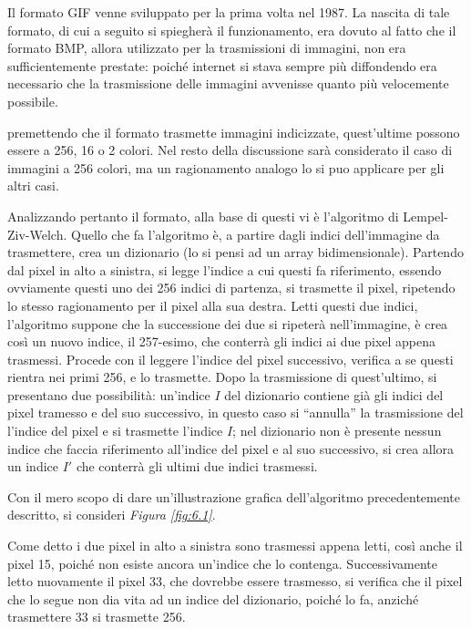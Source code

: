 \documentclass{subfiles}
\begin{document}
Il formato GIF venne sviluppato per la prima volta nel 1987. La nascita di tale formato, di cui a seguito si spiegherà il funzionamento,
era dovuto al fatto che il formato BMP, allora utilizzato per la trasmissioni di immagini, non era sufficientemente prestate:
poiché internet si stava sempre più diffondendo era necessario che la trasmissione delle immagini avvenisse quanto più velocemente possibile.

\begin{Note*}
    premettendo che il formato trasmette immagini indicizzate, quest'ultime possono essere a 256, 16 o 2 colori.
    Nel resto della discussione sarà considerato il caso di immagini a 256 colori, ma un ragionamento analogo lo si puo applicare per gli altri casi.
\end{Note*}

Analizzando pertanto il formato, alla base di questi vi è l'algoritmo di Lempel-Ziv-Welch.
Quello che fa l'algoritmo è, a partire dagli indici dell'immagine da trasmettere, crea un dizionario (lo si pensi ad un array bidimensionale).
Partendo dal pixel in alto a sinistra, si legge l'indice a cui questi fa riferimento, essendo ovviamente questi uno dei 256 indici di partenza,
si trasmette il pixel, ripetendo lo stesso ragionamento per il pixel alla sua destra. Letti questi due indici,
l'algoritmo suppone che la successione dei due si ripeterà nell'immagine, è crea così un nuovo indice, il 257-esimo, che conterrà gli indici ai due pixel appena trasmessi.
Procede con il leggere l'indice del pixel successivo, verifica a se questi rientra nei primi 256, e lo trasmette.
Dopo la trasmissione di quest'ultimo, si presentano due possibilità: un'indice \(I\) del dizionario contiene già gli indici del pixel tramesso e del suo successivo,
in questo caso si ``annulla'' la trasmissione del l'indice del pixel e si trasmette l'indice \(I\);
nel dizionario non è presente nessun indice che faccia riferimento all'indice del pixel e al suo successivo,
si crea allora un indice \(I'\) che conterrà gli ultimi due indici trasmessi.

\begin{Example*}
    Con il mero scopo di dare un'illustrazione grafica dell'algoritmo precedentemente descritto, si consideri \emph{Figura \ref{fig:6.1}}.
    

    Come detto i due pixel in alto a sinistra sono trasmessi appena letti, così anche il pixel 15, poiché non esiste ancora un'indice che lo contenga.
    Successivamente letto nuovamente il pixel 33, che dovrebbe essere trasmesso, si verifica che il pixel che lo segue non dia vita ad un indice del dizionario,
    poiché lo fa, anziché trasmettere 33 si trasmette 256.
\end{Example*}
\end{document}
